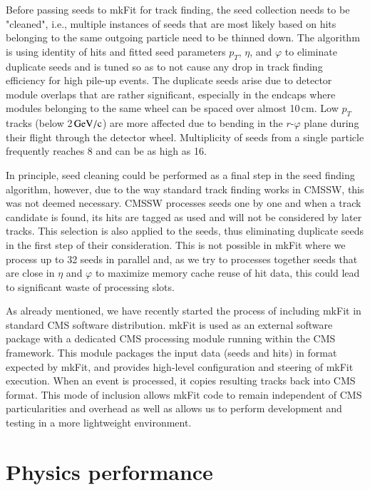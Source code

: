 \documentclass{webofc}
\def\mkfit{mkFit\xspace}
\def\GeVoc{\ensuremath{\,\rm{G}e\rm{V}/c}}
\begin{document}
Before passing seeds to \mkfit for track finding, the seed collection needs to
be "cleaned", i.e., multiple instances of seeds that are most likely based on
hits belonging to the same outgoing particle need to be thinned down. The
algorithm is using identity of hits and fitted seed parameters $p_T$, $\eta$,
and $\varphi$ to eliminate duplicate seeds and is tuned so as to not cause any
drop in track finding efficiency for high pile-up events. The duplicate seeds
arise due to detector module overlaps that are rather significant, especially
in the endcaps where modules belonging to the same wheel can be spaced over
almost 10\,cm. Low $p_T$ tracks (below 2\GeVoc) are more affected due to
bending in the $r$-$\varphi$ plane during their flight through the detector
wheel. Multiplicity of seeds from a single particle frequently reaches 8 and
can be as high as 16.

In principle, seed cleaning could be performed as a final step in the seed
finding algorithm, however, due to the way standard track finding works in
CMSSW, this was not deemed necessary. CMSSW processes seeds one by one and
when a track candidate is found, its hits are tagged as used and will not be
considered by later tracks. This selection is also applied to the seeds, thus
eliminating duplicate seeds in the first step of their consideration. This is
not possible in \mkfit where we process up to 32 seeds in parallel and, as we
try to processes together seeds that are close in $\eta$ and $\varphi$ to
maximize memory cache reuse of hit data, this could lead to significant waste
of processing slots.

As already mentioned, we have recently started the process of including \mkfit
in standard CMS software distribution. \mkfit is used as an external software
package with a dedicated CMS processing module running within the CMS
framework. This module packages the input data (seeds and hits) in format
expected by \mkfit, and provides high-level configuration and steering of
\mkfit execution. When an event is processed, it copies resulting tracks back
into CMS format. This mode of inclusion allows \mkfit code to remain
independent of CMS particularities and overhead as well as allows us to
perform development and testing in a more lightweight environment.


\section{Physics performance}
\label{sec:phys-perf}
\end{document}
